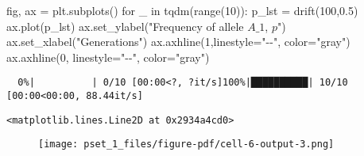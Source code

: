 \documentclass[
  letterpaper,
  DIV=11,
  numbers=noendperiod]{scrartcl}
\newenvironment{Shaded}{\begin{snugshade}}{\end{snugshade}}
\newcommand{\BuiltInTok}[1]{\textcolor[rgb]{0.00,0.23,0.31}{#1}}
\newcommand{\ControlFlowTok}[1]{\textcolor[rgb]{0.00,0.23,0.31}{#1}}
\newcommand{\DecValTok}[1]{\textcolor[rgb]{0.68,0.00,0.00}{#1}}
\newcommand{\FloatTok}[1]{\textcolor[rgb]{0.68,0.00,0.00}{#1}}
\newcommand{\KeywordTok}[1]{\textcolor[rgb]{0.00,0.23,0.31}{#1}}
\newcommand{\NormalTok}[1]{\textcolor[rgb]{0.00,0.23,0.31}{#1}}
\newcommand{\OperatorTok}[1]{\textcolor[rgb]{0.37,0.37,0.37}{#1}}
\newcommand{\StringTok}[1]{\textcolor[rgb]{0.13,0.47,0.30}{#1}}
\begin{document}
\begin{Shaded}
\begin{Highlighting}[]
\NormalTok{fig, ax }\OperatorTok{=}\NormalTok{ plt.subplots()}
\ControlFlowTok{for}\NormalTok{ \_ }\KeywordTok{in}\NormalTok{ tqdm(}\BuiltInTok{range}\NormalTok{(}\DecValTok{10}\NormalTok{)):}
\NormalTok{    p\_lst }\OperatorTok{=}\NormalTok{ drift(}\DecValTok{100}\NormalTok{,}\FloatTok{0.5}\NormalTok{)}
\NormalTok{    ax.plot(p\_lst)}
\NormalTok{ax.set\_ylabel(}\StringTok{"Frequency of allele $A\_1$, $p$"}\NormalTok{)}
\NormalTok{ax.set\_xlabel(}\StringTok{"Generations"}\NormalTok{)}
\NormalTok{ax.axhline(}\DecValTok{1}\NormalTok{,linestyle}\OperatorTok{=}\StringTok{"{-}{-}"}\NormalTok{, color}\OperatorTok{=}\StringTok{"gray"}\NormalTok{)}
\NormalTok{ax.axhline(}\DecValTok{0}\NormalTok{, linestyle}\OperatorTok{=}\StringTok{"{-}{-}"}\NormalTok{, color}\OperatorTok{=}\StringTok{"gray"}\NormalTok{)}
\end{Highlighting}
\end{Shaded}

\begin{verbatim}
  0%|          | 0/10 [00:00<?, ?it/s]100%|██████████| 10/10 [00:00<00:00, 88.44it/s]
\end{verbatim}

\begin{verbatim}
<matplotlib.lines.Line2D at 0x2934a4cd0>
\end{verbatim}

\begin{figure}[H]

{\centering \texttt{[image: pset\_1\_files/figure-pdf/cell-6-output-3.png]}

}

\end{figure}
\end{document}
